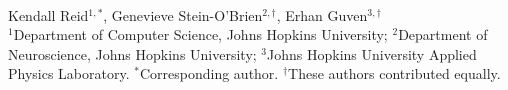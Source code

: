 \documentclass[10pt]{article}
\begin{document}
\begin{center}
{\large\bfseries {}}\\[2pt]
{\small Kendall Reid$^{1,*}$, Genevieve Stein-O'Brien$^{2,\dagger}$, Erhan Guven$^{3,\dagger}$}\\[1pt]
{\footnotesize $^1$Department of Computer Science, Johns Hopkins University; $^2$Department of Neuroscience, Johns Hopkins University; $^3$Johns Hopkins University Applied Physics Laboratory. $^*$Corresponding author. $^\dagger$These authors contributed equally.}\\[1pt]
{\footnotesize {}}
\end{center}
\end{document}
